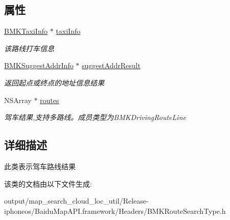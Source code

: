 \subsection*{属性}
\begin{DoxyCompactItemize}
\item 
\hypertarget{interface_b_m_k_driving_route_result_a4dc537f67ed47de78ac3bcda172397dd}{}\hyperlink{interface_b_m_k_taxi_info}{B\+M\+K\+Taxi\+Info} $\ast$ \hyperlink{interface_b_m_k_driving_route_result_a4dc537f67ed47de78ac3bcda172397dd}{taxi\+Info}\label{interface_b_m_k_driving_route_result_a4dc537f67ed47de78ac3bcda172397dd}

\begin{DoxyCompactList}\small\item\em 该路线打车信息 \end{DoxyCompactList}\item 
\hypertarget{interface_b_m_k_driving_route_result_adf554437aec4884ae9fdc7cdb8fc2625}{}\hyperlink{interface_b_m_k_suggest_addr_info}{B\+M\+K\+Suggest\+Addr\+Info} $\ast$ \hyperlink{interface_b_m_k_driving_route_result_adf554437aec4884ae9fdc7cdb8fc2625}{suggest\+Addr\+Result}\label{interface_b_m_k_driving_route_result_adf554437aec4884ae9fdc7cdb8fc2625}

\begin{DoxyCompactList}\small\item\em 返回起点或终点的地址信息结果 \end{DoxyCompactList}\item 
\hypertarget{interface_b_m_k_driving_route_result_a448147e99f71f6bf82c93a51dd2d4b81}{}N\+S\+Array $\ast$ \hyperlink{interface_b_m_k_driving_route_result_a448147e99f71f6bf82c93a51dd2d4b81}{routes}\label{interface_b_m_k_driving_route_result_a448147e99f71f6bf82c93a51dd2d4b81}

\begin{DoxyCompactList}\small\item\em 驾车结果,支持多路线。成员类型为\+B\+M\+K\+Driving\+Route\+Line \end{DoxyCompactList}\end{DoxyCompactItemize}


\subsection{详细描述}
此类表示驾车路线结果 

该类的文档由以下文件生成\+:\begin{DoxyCompactItemize}
\item 
output/map\+\_\+search\+\_\+cloud\+\_\+loc\+\_\+util/\+Release-\/iphoneos/\+Baidu\+Map\+A\+P\+I.\+framework/\+Headers/B\+M\+K\+Route\+Search\+Type.\+h\end{DoxyCompactItemize}
